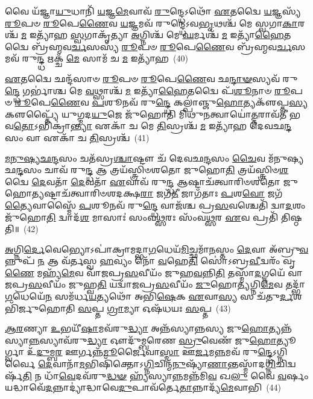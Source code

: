 𑌵𑍈 𑌯᳴𑌜𑍍𑌞𑌾\-\ul{𑌯𑍁}\-𑌧𑌾𑌨𑌿᳴ \ul{𑌯}\-𑌜𑍍𑌞\-\ul{𑌮𑍇}\-𑌵𑌾𑌵᳴ \ul{𑌰𑍁}\-𑌨𑍍𑌦𑍍𑌧𑍇\-𑌽𑌥𑍋᳴ \ul{𑌏}\-𑌤𑌦𑍍𑌵𑍈 \ul{𑌯}\-𑌜𑍍𑌞𑌸𑍍𑌯᳴ \ul{𑌰𑍂}\-𑌪𑍞 \ul{𑌰𑍂}\-𑌪𑍇\-\ul{𑌣𑍈}\-𑌵 \ul{𑌯}\-𑌜𑍍𑌞𑌮𑌵᳴ 𑌰𑍁𑌨𑍍𑌦𑍍𑌧𑍇\-𑌽𑌵\-\ul{𑌭𑍃}\-𑌥𑌶𑍍𑌚᳴ 𑌮𑍇 𑌸𑍍𑌵𑌗𑌾\-\ul{𑌕𑌾}\-𑌰𑌶𑍍𑌚᳴ \ul{𑌮} 𑌇𑌤𑍍𑌯𑌾᳴𑌹 \ul{𑌸𑍍𑌵}\-𑌗𑌾𑌕𑍃᳴𑌤𑍍𑌯𑌾 \ul{𑌅}\-𑌗𑍍𑌨𑌿𑌶𑍍𑌚᳴ 𑌮𑍇 \ul{𑌘}\-𑌰𑍍𑌮𑌶𑍍𑌚᳴ \ul{𑌮} 𑌇𑌤𑍍𑌯𑌾᳴\-\ul{𑌹𑍈}\-𑌤𑌦𑍍𑌵𑍈 𑌬𑍍𑌰᳴𑌹𑍍𑌮𑌵\-\ul{𑌰𑍍𑌚}\-𑌸𑌸𑍍𑌯᳴ \ul{𑌰𑍂}\-𑌪𑍞 \ul{𑌰𑍂}\-𑌪𑍇\-\ul{𑌣𑍈}\-𑌵 𑌬𑍍𑌰᳴𑌹𑍍𑌮𑌵\-\ul{𑌰𑍍𑌚}\-𑌸𑌮𑌵᳴ 𑌰𑍁\-\ul{𑌨𑍍𑌦𑍍𑌧} 𑌋𑌕𑍍𑌚᳴ \ul{𑌮𑍇} 𑌸𑌾𑌮᳴ 𑌚 \ul{𑌮} 𑌇𑌤𑍍𑌯𑌾᳴𑌹~(40)

\-\ul{𑌏}\-𑌤𑌦𑍍𑌵𑍈 𑌛𑌨𑍍𑌦᳴𑌸𑌾𑍞 \ul{𑌰𑍂}\-𑌪𑍞 \ul{𑌰𑍂}\-𑌪𑍇\-\ul{𑌣𑍈}\-𑌵 𑌛\-\ul{𑌨𑍍𑌦𑌾}\-\-\ul{𑍟}\-𑌸𑍍𑌯𑌵᳴ 𑌰𑍁\-\ul{𑌨𑍍𑌦𑍍𑌧𑍇} 𑌗𑌰𑍍𑌭𑌾॑𑌶𑍍𑌚 𑌮𑍇 \ul{𑌵}\-𑌥𑍍𑌸𑌾𑌶𑍍𑌚᳴ \ul{𑌮} 𑌇𑌤𑍍𑌯𑌾᳴\-\ul{𑌹𑍈}\-𑌤𑌦𑍍𑌵𑍈 𑌪᳴\-\ul{𑌶𑍂}\-𑌨𑌾𑍞 \ul{𑌰𑍂}\-𑌪𑍞 \ul{𑌰𑍂}\-𑌪𑍇\-\ul{𑌣𑍈}\-𑌵 \ul{𑌪}\-𑌶𑍂𑌨𑌵᳴ 𑌰𑍁\-\ul{𑌨𑍍𑌦𑍍𑌧𑍇} 𑌕𑌲𑍍𑌪𑌾॑𑌞𑍍𑌜𑍁\-\ul{𑌹𑍋}\-𑌤𑍍𑌯𑌕𑍢᳴𑌪𑍍𑌤\-\ul{𑌸𑍍𑌯} 𑌕𑍢𑌪𑍍𑌤𑍍𑌯𑍈᳴ 𑌯𑍁𑌗𑍍𑌮𑌦\-\ul{𑌯𑍁}\-𑌜𑍇 𑌜𑍁᳴𑌹𑍋𑌤𑌿 𑌮𑌿𑌥𑍁\-\ul{𑌨}\-𑌤𑍍𑌵𑌾𑌯𑍋॑\-\ul{𑌤𑍍𑌤}\-𑌰𑌾𑌵᳴𑌤𑍀 𑌭𑌵\-\ul{𑌤𑍋}\-\-𑌽𑌭𑌿𑌕𑍍𑌰𑌾॑\-\ul{𑌨𑍍𑌤𑍍𑌯𑌾} 𑌏𑌕𑌾᳴ 𑌚 𑌮𑍇 \ul{𑌤𑌿}\-𑌸𑍍𑌰𑌶𑍍𑌚᳴ \ul{𑌮} 𑌇𑌤𑍍𑌯𑌾᳴𑌹 𑌦𑍇𑌵𑌛\-\ul{𑌨𑍍𑌦}\-𑌸𑌂 𑌵𑌾 𑌏𑌕𑌾᳴ 𑌚 \ul{𑌤𑌿}\-𑌸𑍍𑌰𑌶𑍍𑌚᳴~(41)

\-\ul{𑌮}\-\-\ul{𑌨𑍁}\-\-\ul{𑌷𑍍𑌯}\-\-\ul{𑌛}\-\-\ul{𑌨𑍍𑌦}\-𑌸𑌂 𑌚𑌤᳴𑌸𑍍𑌰\-\ul{𑌶𑍍𑌚𑌾}\-𑌷𑍍𑌟𑍗 𑌚᳴ 𑌦𑍇𑌵𑌛\-\ul{𑌨𑍍𑌦}\-𑌸𑌂 \ul{𑌚𑍈}\-𑌵 𑌮᳴𑌨𑍁𑌷𑍍𑌯𑌛\-\ul{𑌨𑍍𑌦}\-𑌸𑌂 𑌚𑌾𑌵᳴ 𑌰𑍁\-\ul{𑌨𑍍𑌦𑍍𑌧} 𑌆 𑌤𑍍𑌰𑌯᳴𑌸𑍍𑌤𑍍𑌰𑌿𑍞𑌶𑌤𑍋 𑌜𑍁𑌹𑍋\-\ul{𑌤𑌿} 𑌤𑍍𑌰𑌯᳴𑌸𑍍𑌤𑍍𑌰𑌿𑍞\-\ul{𑌶}\-𑌦𑍍𑌵𑍈 \ul{𑌦𑍇}\-𑌵𑌤𑌾᳴ \ul{𑌦𑍇}\-𑌵𑌤𑌾᳴ \ul{𑌏}\-𑌵𑌾𑌵᳴ 𑌰𑍁\-\ul{𑌨𑍍𑌦𑍍𑌧} 𑌆𑌷𑍍𑌟𑌾𑌚᳴𑌤𑍍𑌵𑌾𑌰𑌿𑍞𑌶𑌤𑍋 𑌜𑍁𑌹𑍋\-\ul{𑌤𑍍𑌯}\-𑌷𑍍𑌟𑌾𑌚᳴𑌤𑍍𑌵𑌾𑌰𑌿𑍞𑌶𑌦𑌕𑍍𑌷\-\ul{𑌰𑌾} 𑌜𑌗᳴\-\ul{𑌤𑍀} 𑌜𑌾𑌗᳴𑌤𑌾𑌃 \ul{𑌪}\-𑌶\-\ul{𑌵𑍋} 𑌜𑌗᳴\-\ul{𑌤𑍍𑌯𑍈}\-𑌵𑌾𑌸𑍍𑌮𑍈᳴ \ul{𑌪}\-𑌶𑍂𑌨𑌵᳴ 𑌰𑍁\-\ul{𑌨𑍍𑌦𑍍𑌧𑍇} 𑌵𑌾𑌜᳴𑌶𑍍𑌚 𑌪𑍍𑌰\-\ul{𑌸}\-𑌵𑌶𑍍𑌚𑍇𑌤𑌿᳴ 𑌦𑍍𑌵𑌾\-\ul{𑌦}\-𑌶𑌂 𑌜𑍁᳴𑌹𑍋\-\ul{𑌤𑌿} 𑌦𑍍𑌵𑌾𑌦᳴\-\ul{𑌶} 𑌮𑌾𑌸𑌾𑌃॑ 𑌸𑌂𑌵\-\ul{𑌥𑍍𑌸}\-𑌰𑌃 𑌸𑌂᳴𑌵\-\ul{𑌥𑍍𑌸}\-𑌰 \ul{𑌏}\-𑌵 𑌪𑍍𑌰𑌤𑌿᳴ 𑌤𑌿𑌷𑍍𑌠𑌤𑌿॥~(42)

{\anuvakamend[{𑌵𑌿 𑌵𑍈 \ul{𑌯}\-𑌜𑍍𑌞𑌃 𑌸𑌾𑌮᳴ 𑌚 \ul{𑌮} 𑌇𑌤𑍍𑌯𑌾᳴𑌹 𑌚 \ul{𑌤𑌿}\-𑌸𑍍𑌰𑌶𑍍𑌚𑍈\-\ul{𑌕𑌾}\-𑌨𑍍𑌨𑌪᳴\-\ul{𑌞𑍍𑌚𑌾}\-𑌶𑌚𑍍𑌚᳴}]}%

\-\ul{𑌅}\-𑌗𑍍𑌨𑌿\-\ul{𑌰𑍍𑌦𑍇}\-𑌵𑍇𑌭𑍍𑌯𑍋\-𑌽𑌪𑌾॑𑌕𑍍𑌰𑌾𑌮𑌦𑍍𑌭𑌾\-\ul{𑌗}\-𑌧𑍇𑌯᳴\-\ul{𑌮𑌿}\-𑌚𑍍𑌛𑌮𑌾᳴\-\ul{𑌨}\-𑌸𑍍𑌤𑌂 \ul{𑌦𑍇}\-𑌵𑌾 𑌅᳴𑌬𑍍𑌰𑍁\-\ul{𑌵}\-𑌨𑍍𑌨𑍁𑌪᳴ \ul{𑌨} 𑌆 𑌵᳴𑌰𑍍𑌤𑌸𑍍𑌵 \ul{𑌹}\-𑌵𑍍𑌯𑌂 𑌨𑍋᳴ \ul{𑌵}\-𑌹𑍇\-\ul{𑌤𑌿} 𑌸𑍋॑\-𑌽𑌬𑍍𑌰\-\ul{𑌵𑍀}\-𑌦𑍍𑌵𑌰𑌂᳴ 𑌵𑍃\-\ul{𑌣𑍈} 𑌮𑌹𑍍𑌯᳴\-\ul{𑌮𑍇}\-𑌵 𑌵𑌾᳴𑌜𑌪𑍍𑌰\-\ul{𑌸}\-𑌵𑍀𑌯𑌂᳴ 𑌜𑍁𑌹\-\ul{𑌵}\-𑌨𑍍𑌨𑌿\-\ul{𑌤𑌿} 𑌤𑌸𑍍𑌮𑌾᳴\-\ul{𑌦}\-𑌗𑍍𑌨𑌯𑍇᳴ 𑌵𑌾𑌜𑌪𑍍𑌰\-\ul{𑌸}\-𑌵𑍀𑌯𑌂᳴ 𑌜𑍁𑌹𑍍𑌵\-\ul{𑌤𑌿} 𑌯𑌦𑍍𑌵𑌾᳴𑌜𑌪𑍍𑌰\-\ul{𑌸}\-𑌵𑍀𑌯𑌂᳴ \ul{𑌜𑍁}\-𑌹𑍋\-\ul{𑌤𑍍𑌯}\-𑌗𑍍𑌨𑌿\-\ul{𑌮𑍇}\-𑌵 𑌤𑌦𑍍𑌭𑌾᳴\-\ul{𑌗}\-𑌧𑍇𑌯𑍇᳴\-\ul{𑌨} 𑌸𑌮᳴𑌰𑍍𑌧\-\ul{𑌯}\-𑌤𑍍𑌯𑌥𑍋᳴ 𑌅𑌭𑌿\-\ul{𑌷𑍇}\-𑌕 \ul{𑌏}\-𑌵𑌾\-\ul{𑌸𑍍𑌯} 𑌸 𑌚᳴𑌤𑍁\-\ul{𑌰𑍍𑌦}\-𑌶𑌭𑌿᳴𑌰𑍍𑌜𑍁𑌹𑍋𑌤𑌿 \ul{𑌸}\-𑌪𑍍𑌤 \ul{𑌗𑍍𑌰𑌾}\-𑌮𑍍𑌯𑌾 𑌓𑌷᳴𑌧𑌯𑌃 \ul{𑌸}\-𑌪𑍍𑌤~(43)

\-\ul{𑌆}\-\-\ul{𑌰}\-𑌣𑍍𑌯𑌾 \ul{𑌉}\-𑌭𑌯𑍀᳴\-\ul{𑌷𑌾}\-𑌮𑌵᳴𑌰𑍁\-\ul{𑌦𑍍𑌧𑍍𑌯𑌾} 𑌅𑌨𑍍𑌨᳴𑌸𑍍𑌯𑌾𑌨𑍍𑌨𑌸𑍍𑌯 𑌜𑍁\-\ul{𑌹𑍋}\-𑌤𑍍𑌯𑌨𑍍𑌨᳴𑌸𑍍𑌯𑌾\-\ul{𑌨𑍍𑌨}\-𑌸𑍍𑌯𑌾𑌵᳴𑌰𑍁\-\ul{𑌦𑍍𑌧𑍍𑌯𑌾} 𑌔𑌦𑍁᳴𑌮𑍍𑌬𑌰𑍇𑌣 \ul{𑌸𑍍𑌰𑍁}\-𑌵𑍇𑌣᳴ 𑌜𑍁\-\ul{𑌹𑍋}\-𑌤𑍍𑌯𑍂𑌰𑍍𑌗𑍍𑌵𑌾 𑌉᳴\-\ul{𑌦𑍁}\-𑌮𑍍𑌬\-\ul{𑌰} 𑌊𑌰𑍍𑌗𑌨𑍍𑌨᳴\-\ul{𑌮𑍂}\-𑌰𑍍𑌜𑍈𑌵𑌾\-\ul{𑌸𑍍𑌮𑌾} 𑌊\-\ul{𑌰𑍍𑌜}\-𑌮\-\ul{𑌨𑍍𑌨}\-𑌮𑌵᳴ 𑌰𑍁\-\ul{𑌨𑍍𑌦𑍍𑌧𑍇}\-\-𑌽𑌗𑍍𑌨𑌿𑌰𑍍𑌵𑍈 \ul{𑌦𑍇}\-𑌵𑌾𑌨𑌾᳴\-\ul{𑌮}\-𑌭𑌿𑌷𑌿᳴𑌕𑍍𑌤𑍋\-𑌽\-\ul{𑌗𑍍𑌨𑌿}\-𑌚𑌿𑌨𑍍𑌮᳴\-\ul{𑌨𑍁}\-𑌷𑍍𑌯𑌾᳴\-\ul{𑌣𑌾}\-𑌨𑍍𑌤𑌸𑍍𑌮𑌾᳴𑌦\-\ul{𑌗𑍍𑌨𑌿}\-𑌚𑌿𑌦𑍍𑌵𑌰𑍍\mbox{}𑌷᳴\-\ul{𑌤𑌿} 𑌨 𑌧𑌾᳴\-\ul{𑌵𑍇}\-𑌦𑌵᳴𑌰𑍁\-\ul{𑌦𑍍𑌧}\-\-\ul{𑍟} 𑌹𑍍𑌯᳴𑌸𑍍𑌯𑌾\-\ul{𑌨𑍍𑌨}\-𑌮𑌨𑍍𑌨᳴𑌮𑌿\-\ul{𑌵} 𑌖\-\ul{𑌲𑍁} 𑌵𑍈 \ul{𑌵}\-𑌰𑍍\mbox{}𑌷𑌂 𑌯𑌦𑍍𑌧𑌾𑌵𑍇᳴\-\ul{𑌦}\-𑌨𑍍𑌨𑌾𑌦𑍍𑌯𑌾॑𑌦𑍍𑌧𑌾𑌵𑍇\-\ul{𑌦𑍁}\-𑌪𑌾𑌵᳴𑌰𑍍𑌤𑍇\-\ul{𑌤𑌾}\-𑌨𑍍𑌨𑌾𑌦𑍍𑌯᳴\-\ul{𑌮𑍇}\-𑌵𑌾𑌭𑌿~(44)

